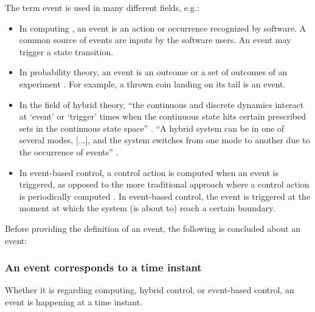 The term event is used in many different fields, e.g.:
\begin{itemize}
	\item In computing \cite{breu1997towards}, an event is an action or occurrence recognized by software. A common source of events are inputs by the software users. An event may trigger a state transition.
	\item In probability theory, an event is an outcome or a set of outcomes of an experiment \cite{pfeiffer2013concepts}. For example, a thrown coin landing on its tail is an event.
	\item In the field of hybrid theory, ``the continuous and discrete dynamics interact at `event' or `trigger' times when the continuous state hits certain prescribed sets in the continuous state space'' \cite{branicky1998hybridcontrol}. ``A hybrid system can be in one of several modes, [...], and the system switches from one mode to another due to the occurrence of events'' \cite{deschutter2000optimal}.
	\item In event-based control, a control action is computed when an event is triggered, as opposed to the more traditional approach where a control action is periodically computed \cite{heemels2012eventcontrol}. In event-based control, the event is triggered at the moment at which the system (is about to) reach a certain boundary.
\end{itemize}

Before providing the definition of an event, the following is concluded about an event:

\subsubsection{An event corresponds to a time instant}
Whether it is regarding computing, hybrid control, or event-based control, an event is happening at a time instant.

